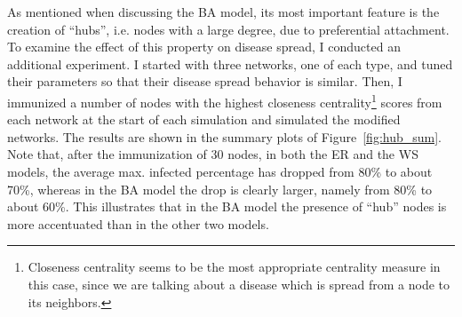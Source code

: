\documentclass[11pt]{article} %
\begin{document}
As mentioned when discussing the BA model, its most important feature
is the creation of ``hubs'', i.e. nodes with a large degree, due to
preferential attachment. To examine the effect of this property
on disease spread, I conducted an additional experiment. I started
with three networks, one of each type, and tuned their parameters
so that their disease spread behavior is similar. Then, I immunized
a number of nodes with the highest closeness
centrality\footnote{Closeness centrality seems to be the most appropriate
centrality measure in this case, since we are talking about a disease which
is spread from a node to its neighbors.}
scores from
each network at the start of each simulation and simulated
the modified networks. The results are shown in the summary plots of
Figure~\ref{fig:hub_sum}. Note that, after the immunization of 30 nodes,
in both the ER and the WS models, the average max. infected percentage
has dropped from 80\% to about 70\%, whereas in the BA model the
drop is clearly larger, namely from 80\% to about 60\%. This illustrates
that in the BA model the presence of ``hub'' nodes is more accentuated
than in the other two models.
\end{document}
